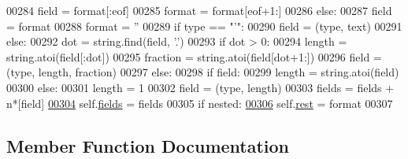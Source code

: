 \begin{DoxyCode}
00284                         field = format[:eof]
00285                         format = format[eof+1:]
00286                     \textcolor{keywordflow}{else}:
00287                         field = format
00288                         format = \textcolor{stringliteral}{''}
00289                 \textcolor{keywordflow}{if} type == \textcolor{stringliteral}{"'"}:
00290                     field = (type, text)
00291                 \textcolor{keywordflow}{else}:
00292                     dot = string.find(field, \textcolor{stringliteral}{'.'})
00293                     \textcolor{keywordflow}{if} dot > 0:
00294                         length = string.atoi(field[:dot])
00295                         fraction = string.atoi(field[dot+1:])
00296                         field = (type, length, fraction)
00297                     \textcolor{keywordflow}{else}:
00298                         \textcolor{keywordflow}{if} field:
00299                             length = string.atoi(field)
00300                         \textcolor{keywordflow}{else}:
00301                             length = 1
00302                         field = (type, length)
00303                 fields = fields + n*[field]
\hypertarget{classpyneb_1_1utils_1_1_fortran_format_1_1_fortran_format_l00304}{}\hyperlink{classpyneb_1_1utils_1_1_fortran_format_1_1_fortran_format_ac8f962282ba9e35ccd8dad5feacd3813}{00304}         self.\hyperlink{classpyneb_1_1utils_1_1_fortran_format_1_1_fortran_format_ac8f962282ba9e35ccd8dad5feacd3813}{fields} = fields
00305         \textcolor{keywordflow}{if} nested:
\hypertarget{classpyneb_1_1utils_1_1_fortran_format_1_1_fortran_format_l00306}{}\hyperlink{classpyneb_1_1utils_1_1_fortran_format_1_1_fortran_format_a6567d6b3709b1db086972c2fe1855006}{00306}             self.\hyperlink{classpyneb_1_1utils_1_1_fortran_format_1_1_fortran_format_a6567d6b3709b1db086972c2fe1855006}{rest} = format
00307 
\end{DoxyCode}


\subsection{Member Function Documentation}
\hypertarget{classpyneb_1_1utils_1_1_fortran_format_1_1_fortran_format_a8fc69af902245845b7fceba5e8f7974f}{}
